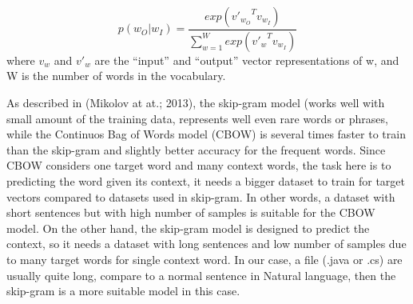 \begin{displaymath}
p(w_{O}|w_{I}) = \frac{exp({{v'}_{w_{O}}}^{T}v_{w_{I}})}    {\sum_{w=1}^W exp({{v'}_{w}}^{T}v_{w_{I}})}
\end{displaymath}
where \begin{math}v_{w}\end{math} and \begin{math}{v'}_{w}\end{math} are the “input” and “output” vector representations of w, and W is the number of words in the vocabulary.

As described in (Mikolov at at.; 2013)\cite{mikolov2013distributed}, the skip-gram model (works well with small amount of the training data, represents well even rare words or phrases, while the Continuos Bag of Words model (CBOW) is several times faster to train than the skip-gram and slightly better accuracy for the frequent words. Since CBOW considers one target word and many context words, the task here is to predicting the word given its context, it needs a bigger dataset to train for target vectors compared to datasets used in skip-gram. In other words, a dataset with short sentences but with high number of samples is suitable for the CBOW model. On the other hand, the skip-gram model is designed to predict the context, so it needs a dataset with long sentences and low number of samples due to many target words for single context word. In our case, a file (.java or .cs) are usually quite long, compare to a normal sentence in Natural language, then the skip-gram is a more suitable model in this case. 

